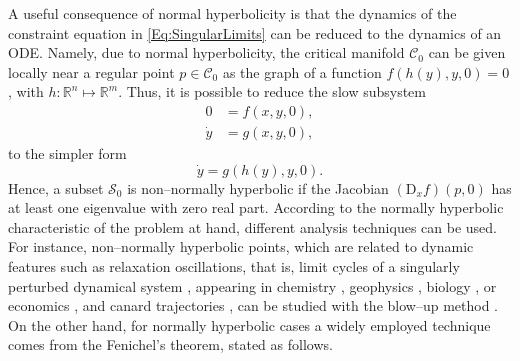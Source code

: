 \documentclass[3p]{elsarticle}
\theoremstyle{plain}
\theoremstyle{remark}
\theoremstyle{definition}
\begin{document}
A useful consequence of normal hyperbolicity is that the dynamics of the constraint equation in \eqref{Eq:SingularLimits} can be reduced to the dynamics of an ODE. Namely, due to normal hyperbolicity, the critical manifold $\mathcal{C}_{0}$ can be given locally near a regular point $p\in\mathcal{C}_{0}$ as the graph of a function $f(h(y),y,0)=0$, with $h:\mathbb{R}^{n}\mapsto\mathbb{R}^{m}$. Thus, it is possible to reduce the slow subsystem
\begin{equation}
    \begin{aligned}
        0&=f(x,y,0),\\
        \dot{y}&=g(x,y,0),
    \end{aligned}
\end{equation}
to the simpler form
\begin{equation}
    \dot{y}=g(h(y),y,0).
\end{equation}
        Hence, a subset $\mathcal{S}_{0}$ is non--normally hyperbolic if the Jacobian $(\text{D}_{x}f)(p,0)$ has at least one eigenvalue with zero real part. According to the normally hyperbolic characteristic of the problem at hand, different analysis techniques can be used. For instance, non--normally hyperbolic points, which are related to dynamic features such as relaxation oscillations, that is, limit cycles of a singularly perturbed dynamical system \cite{Ref:Grasman2011}, appearing in chemistry \cite{Ref:Rossler1978}, geophysics \cite{Ref:Vasconcelos1996}, biology \cite{Ref:Deng2004, Ref:Shen2016, Ref:Zhao2022}, or economics \cite{Ref:Hamburger1934, Ref:Varian1979}, and canard trajectories \cite{Ref:Desroches2016}, can be studied with the blow--up method \cite{Ref:Dumortier1991, Ref:Alvarez2011, Ref:Kuehn2015, Ref:Jardon2021}. On the other hand, for normally hyperbolic cases a widely employed technique comes from the Fenichel's theorem, stated as follows.
\end{document}
